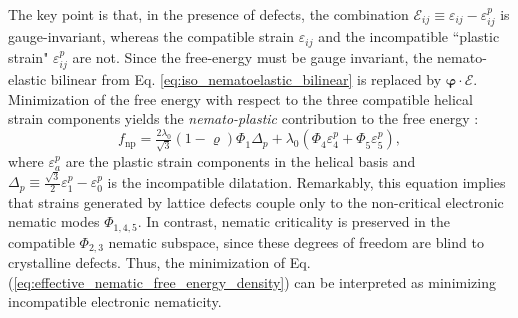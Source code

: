 \documentclass[aps,prb, twocolumn, superscriptaddress, amsmath, amsfonts, amssymb, amsthm]{revtex4-2}
\renewcommand{\eqref}[1]{Eq. (\ref{#1})}
\begin{document}
The key point is that, in the presence of defects, the combination $\mathscr{E}_{ij} \equiv \varepsilon_{ij} - \varepsilon_{ij}^p$ is gauge-invariant, whereas the compatible strain $\varepsilon_{ij}$  and the incompatible ``plastic strain" $\varepsilon_{ij}^p$ are not. Since the free-energy must be gauge invariant, the nemato-elastic bilinear from Eq. \ref{eq:iso_nematoelastic_bilinear} is replaced by $ \boldsymbol{\varphi}\cdot \boldsymbol{\mathscr{E}} $. Minimization of the free energy with respect to the three compatible helical strain components yields the  \textit{nemato-plastic} contribution to the free energy \citep{LongPaper}:
\begin{equation}
    f_{\text{np}} = \tfrac{2\lambda_0}{\sqrt{3}}(1-\varrho) \Phi_1^{\phantom{p}}\Delta_p +\lambda_0(\Phi_4^{\phantom{p}}\varepsilon_4^p + \Phi_5^{\phantom{p}}\varepsilon_5^p),
\end{equation}
where  $\varepsilon^p_{a}$  are the plastic strain components in the helical basis and $\Delta_p \equiv \frac{\sqrt{3}}{2}\varepsilon^p_1 - \varepsilon^p_0$ is the incompatible dilatation. Remarkably, this equation implies that strains generated by lattice defects couple only to the non-critical electronic nematic modes  $\Phi_{1,4,5}$. In contrast, nematic criticality is preserved in the compatible $\Phi_{2,3}$  nematic subspace, since these degrees of freedom are blind to crystalline defects. Thus, the minimization of  \eqref{eq:effective_nematic_free_energy_density} can be interpreted as minimizing incompatible electronic nematicity.
\end{document}
